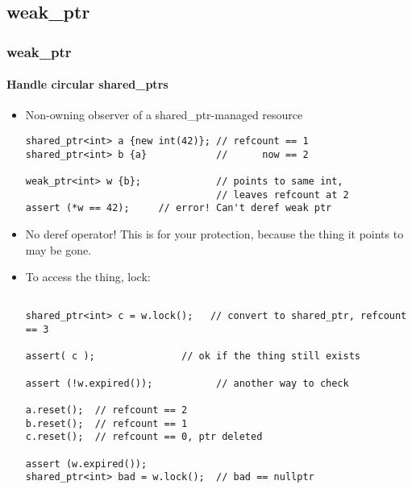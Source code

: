 


\subsection{weak\_ptr}
\begin{frame}[fragile]
\frametitle{weak\_ptr}
\framesubtitle{Handle circular shared\_ptrs}

\begin{itemize}
\item Non-owning observer of a shared\_ptr-managed resource
{\scriptsize\begin{verbatim}
shared_ptr<int> a {new int(42)}; // refcount == 1
shared_ptr<int> b {a}            //      now == 2

weak_ptr<int> w {b};             // points to same int,
                                 // leaves refcount at 2
assert (*w == 42);     // error! Can't deref weak ptr
\end{verbatim}
}
\pause{}
\item No deref operator!  This is for your protection, because the
  thing it points to may be gone.
\pause{}
\item To access the thing, lock:
{\scriptsize\begin{verbatim}

shared_ptr<int> c = w.lock();   // convert to shared_ptr, refcount == 3

assert( c );               // ok if the thing still exists

assert (!w.expired());           // another way to check

a.reset();  // refcount == 2
b.reset();  // refcount == 1
c.reset();  // refcount == 0, ptr deleted

assert (w.expired());
shared_ptr<int> bad = w.lock();  // bad == nullptr
\end{verbatim} 
}
\end{itemize}
\end{frame}

